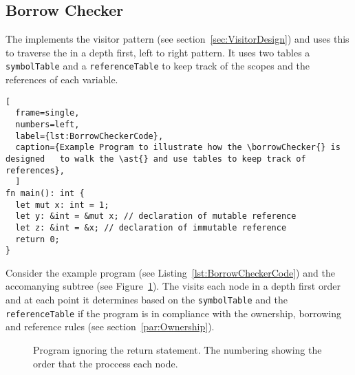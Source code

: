 \subsection{Borrow Checker}
\label{sec:BorrowCheckerDesign}

The \borrowChecker{} implements the visitor pattern (see
section~\ref{sec:VisitorDesign}) and uses this to traverse the \ast{} in a depth
first, left to right pattern. It uses two tables a \texttt{symbolTable} and a
\texttt{referenceTable} to keep track of the scopes and the
references of each variable.

\begin{lstlisting}[
  frame=single,
  numbers=left,
  label={lst:BorrowCheckerCode},
  caption={Example Program to illustrate how the \borrowChecker{} is designed   to walk the \ast{} and use tables to keep track of references},
  ]
fn main(): int {
  let mut x: int = 1;
  let y: &int = &mut x; // declaration of mutable reference
  let z: &int = &x; // declaration of immutable reference
  return 0;
}
\end{lstlisting}

Consider the example program (see Listing~\ref{lst:BorrowCheckerCode}) and the
accomanying subtree (see Figure~\ref{fig:astBorrowCheckerDesignCode}). The
\borrowChecker{} visits each node
in a depth first order and at each point it determines based on the \texttt{symbolTable}
and the \texttt{referenceTable} if the
program is in compliance with the ownership, borrowing and reference rules (see
section~\ref{par:Ownership}).

\begin{figure}[ht]
  \centering
  \caption{Program \ast{} ignoring the return statement. The numbering showing the
  order that the \borrowChecker{} proccess each node.}
  \label{fig:astBorrowCheckerDesignCode}
\end{figure}

